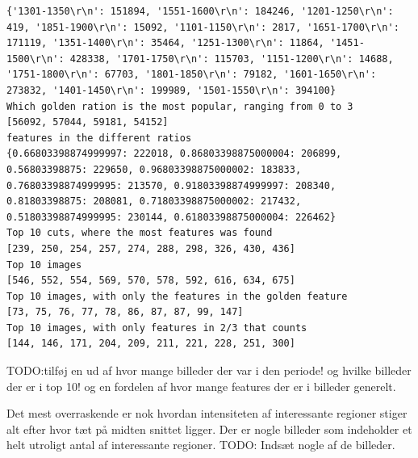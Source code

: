 {\begin{verbatim}
{'1301-1350\r\n': 151894, '1551-1600\r\n': 184246, '1201-1250\r\n': 419, '1851-1900\r\n': 15092, '1101-1150\r\n': 2817, '1651-1700\r\n': 171119, '1351-1400\r\n': 35464, '1251-1300\r\n': 11864, '1451-1500\r\n': 428338, '1701-1750\r\n': 115703, '1151-1200\r\n': 14688, '1751-1800\r\n': 67703, '1801-1850\r\n': 79182, '1601-1650\r\n': 273832, '1401-1450\r\n': 199989, '1501-1550\r\n': 394100}
Which golden ration is the most popular, ranging from 0 to 3
[56092, 57044, 59181, 54152]
features in the different ratios
{0.66803398874999997: 222018, 0.86803398875000004: 206899, 0.56803398875: 229650, 0.96803398875000002: 183833, 0.76803398874999995: 213570, 0.91803398874999997: 208340, 0.81803398875: 208081, 0.71803398875000002: 217432, 0.51803398874999995: 230144, 0.61803398875000004: 226462}
Top 10 cuts, where the most features was found
[239, 250, 254, 257, 274, 288, 298, 326, 430, 436]
Top 10 images
[546, 552, 554, 569, 570, 578, 592, 616, 634, 675]
Top 10 images, with only the features in the golden feature
[73, 75, 76, 77, 78, 86, 87, 87, 99, 147]
Top 10 images, with only features in 2/3 that counts
[144, 146, 171, 204, 209, 211, 221, 228, 251, 300]
\end{verbatim}
TODO:tilføj en ud af hvor mange billeder der var i den periode!
	og hvilke billeder der er i top 10!
	og en fordelen af hvor mange features der er i billeder generelt.

Det mest overraskende er nok hvordan intensiteten af interessante
regioner stiger alt efter hvor tæt på midten snittet ligger.
Der er nogle billeder som indeholder et helt utroligt antal af
interessante regioner.
TODO: Indsæt nogle af de billeder.
}
